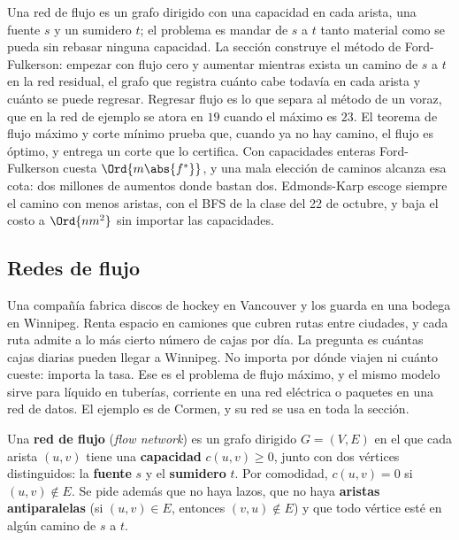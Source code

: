 \documentclass[11pt,letterpaper]{article}
\begin{document}
\begin{quick_sum}
  Una red de flujo es un grafo dirigido con una capacidad en cada
  arista, una fuente $s$ y un sumidero $t$; el problema es mandar de
  $s$ a $t$ tanto material como se pueda sin rebasar ninguna
  capacidad. La sección construye el método de Ford-Fulkerson:
  empezar con flujo cero y aumentar mientras exista un camino de $s$ a
  $t$ en la red residual, el grafo que registra cuánto cabe todavía en
  cada arista y cuánto se puede regresar. Regresar flujo es lo que
  separa al método de un voraz, que en la red de ejemplo se atora en
  $19$ cuando el máximo es $23$. El teorema de flujo máximo y corte
  mínimo prueba que, cuando ya no hay camino, el flujo es óptimo, y
  entrega un corte que lo certifica. Con capacidades enteras
  Ford-Fulkerson cuesta $\Ord{m \abs{f^*}}$, y una mala elección de
  caminos alcanza esa cota: dos millones de aumentos donde bastan dos.
  Edmonds-Karp escoge siempre el camino con menos aristas, con el BFS
  de la clase del 22 de octubre, y baja el costo a $\Ord{n m^2}$ sin
  importar las capacidades.
\end{quick_sum}

\subsection*{Redes de flujo}

Una compañía fabrica discos de hockey en Vancouver y los guarda en una
bodega en Winnipeg. Renta espacio en camiones que cubren rutas entre
ciudades, y cada ruta admite a lo más cierto número de cajas por día.
La pregunta es cuántas cajas diarias pueden llegar a Winnipeg. No
importa por dónde viajen ni cuánto cueste: importa la tasa. Ese es el
problema de flujo máximo, y el mismo modelo sirve para líquido en
tuberías, corriente en una red eléctrica o paquetes en una red de
datos. El ejemplo es de Cormen, y su red se usa en toda la sección.

\begin{definicion}
  Una \textbf{red de flujo} (\textit{flow network}) es un grafo
  dirigido $G = (V, E)$ en el que cada arista $(u, v)$ tiene una
  \textbf{capacidad} $c(u, v) \ge 0$, junto con dos vértices
  distinguidos: la \textbf{fuente} $s$ y el \textbf{sumidero} $t$. Por
  comodidad, $c(u, v) = 0$ si $(u, v) \notin E$. Se pide además que no
  haya lazos, que no haya \textbf{aristas antiparalelas} (si
  $(u, v) \in E$, entonces $(v, u) \notin E$) y que todo vértice esté
  en algún camino de $s$ a $t$.
\end{definicion}
\end{document}
